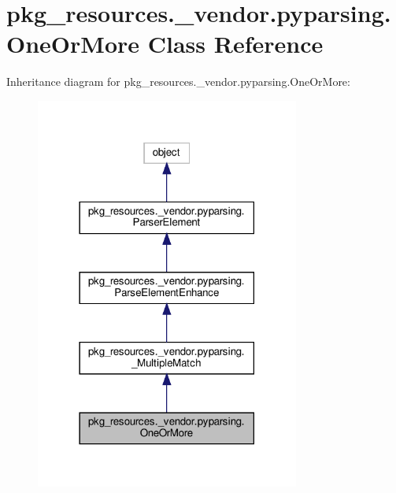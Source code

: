 \hypertarget{classpkg__resources_1_1__vendor_1_1pyparsing_1_1OneOrMore}{}\section{pkg\+\_\+resources.\+\_\+vendor.\+pyparsing.\+One\+Or\+More Class Reference}
\label{classpkg__resources_1_1__vendor_1_1pyparsing_1_1OneOrMore}


Inheritance diagram for pkg\+\_\+resources.\+\_\+vendor.\+pyparsing.\+One\+Or\+More\+:
\nopagebreak
\begin{figure}[H]
\begin{center}
\leavevmode
\includegraphics[width=246pt]{classpkg__resources_1_1__vendor_1_1pyparsing_1_1OneOrMore__inherit__graph}
\end{center}
\end{figure}



